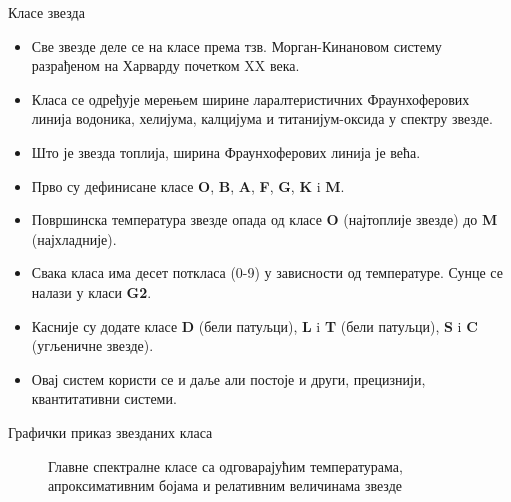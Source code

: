 \documentclass[aspectratio=169, xcolor=table, 10pt]{beamer}
\theoremstyle{definition}
\begin{document}
\begin{frame}{Класе звезда}
  \begin {itemize}
    \item Све звезде деле се на класе према тзв. Морган-Кинановом систему разрађеном на Харварду почетком XX века.
    \item Класа се одређује мерењем ширине ларалтеристичних Фраунхоферових линија водоника, хелијума, калцијума и титанијум-оксида у спектру звезде.
    \item Што је звезда топлија, ширина Фраунхоферових линија је већа.
    \item Прво су дефинисане класе \textbf{O}, \textbf{B}, \textbf{A}, \textbf{F}, \textbf{G}, \textbf{K} i \textbf{M}.
    \item Површинска температура звезде опада од класе \textbf{O} (најтоплије звезде) до \textbf{M} (најхладније).
    \item Свака класа има десет поткласа (0-9) у зависности од температуре. Сунце се налази у класи \textbf{G2}.
    \item Касније су додате класе \textbf{D} (бели патуљци), \textbf{L} i \textbf{T} (бели патуљци), \textbf{S} i \textbf{C} (угљеничне звезде).
    \item Овај систем користи се и даље али постоје и други, прецизнији, квантитативни системи.
  \end {itemize}
\end{frame}

\begin{frame}{Графички приказ звезданих класа}
  \begin{figure}
    \centering
    \captionsetup{width=\wd0}
    \caption{Главне спектралне класе са одговарајућим температурама, апроксимативним бојама и релативним величинама звезде}
  \end{figure}
\end{frame}
\end{document}
